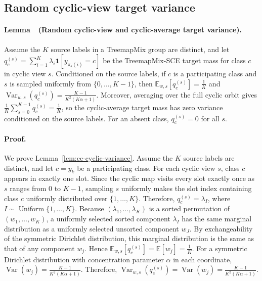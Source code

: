 \subsection{Random cyclic-view target variance}

\label{lem:ce-cyclic-variance}
\paragraph{Lemma~\thelemma\ (Random cyclic-view and cyclic-average target variance).}
Assume the $K$ source labels in a TreemapMix group are distinct, and let \(q_c^{(s)}=\sum_{i=1}^{K}\lambda_i\mathbf{1}[y_{\pi_s(i)}=c]\) be the TreemapMix-SCE target mass for class $c$ in cyclic view $s$. Conditioned on the source labels, if $c$ is a participating class and $s$ is sampled uniformly from $\{0,\dots,K-1\}$, then \(\mathbb{E}_{w,s}[q_c^{(s)}]=\frac{1}{K}\) and \(\operatorname{Var}_{w,s}(q_c^{(s)})=\frac{K-1}{K^2(K\alpha+1)}\). Moreover, averaging over the full cyclic orbit gives \(\frac{1}{K}\sum_{s=0}^{K-1}q_c^{(s)}=\frac{1}{K}\), so the cyclic-average target mass has zero variance conditioned on the source labels. For an absent class, \(q_c^{(s)}=0\) for all \(s\).

\paragraph{Proof.}

We prove Lemma~\ref{lem:ce-cyclic-variance}. Assume the $K$ source labels are distinct, and let $c=y_k$ be a participating class. For each cyclic view $s$, class $c$ appears in exactly one slot. Since the cyclic map visits every slot exactly once as $s$ ranges from $0$ to $K-1$, sampling $s$ uniformly makes the slot index containing class $c$ uniformly distributed over $\{1,\dots,K\}$. Therefore, \(q_c^{(s)}=\lambda_I\), where \(I\sim\operatorname{Uniform}\{1,\dots,K\}\).
Because $(\lambda_1,\dots,\lambda_K)$ is a sorted permutation of $(w_1,\dots,w_K)$, a uniformly selected sorted component $\lambda_I$ has the same marginal distribution as a uniformly selected unsorted component $w_J$. By exchangeability of the symmetric Dirichlet distribution, this marginal distribution is the same as that of any component $w_j$. Hence
\(\mathbb{E}_{w,s}[q_c^{(s)}]=\mathbb{E}[w_j]=\frac{1}{K}\).
For a symmetric Dirichlet distribution with concentration parameter $\alpha$ in each coordinate,
\(\operatorname{Var}(w_j)=\frac{K-1}{K^2(K\alpha+1)}\). Therefore, \(\operatorname{Var}_{w,s}(q_c^{(s)})=\operatorname{Var}(w_j)=\frac{K-1}{K^2(K\alpha+1)}\).

